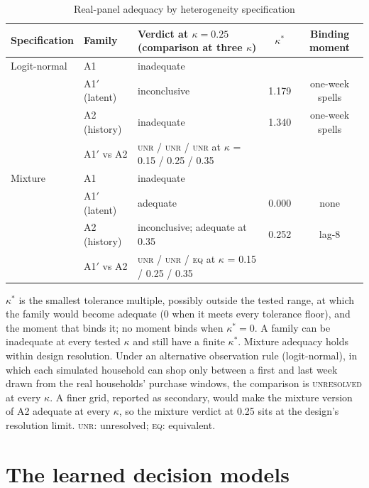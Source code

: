 \documentclass[11pt]{article}
\begin{document}
\begin{table}[h]
\centering\small
\caption{Real-panel adequacy by heterogeneity specification}
\label{tab:real}
\begin{tabular}{@{}l l l c c@{}}
\toprule
Specification & Family & Verdict at $\kappa=0.25$ (comparison at three $\kappa$) & $\kappa^*$ & Binding moment \\
\midrule
Logit-normal & A1 & inadequate & & \\
             & A1$'$ (latent) & inconclusive & 1.179 & one-week spells \\
             & A2 (history) & inadequate & 1.340 & one-week spells \\
             & A1$'$ vs A2 & \textsc{unr} / \textsc{unr} / \textsc{unr} at $\kappa$ = 0.15 / 0.25 / 0.35 & & \\
\addlinespace[6pt]
Mixture      & A1 & inadequate & & \\
             & A1$'$ (latent) & adequate & 0.000 & none \\
             & A2 (history) & inconclusive; adequate at 0.35 & 0.252 & lag-8 \\
             & A1$'$ vs A2 & \textsc{unr} / \textsc{unr} / \textsc{eq} at $\kappa$ = 0.15 / 0.25 / 0.35 & & \\
\bottomrule
\end{tabular}

\smallskip
\parbox{0.94\textwidth}{\footnotesize $\kappa^*$ is the smallest tolerance multiple, possibly
outside the tested range, at which the family would become adequate (0 when it meets every tolerance floor), and the moment that binds it; no moment binds when $\kappa^*=0$.
A family can be inadequate at every tested $\kappa$ and still have a finite $\kappa^*$. Mixture
adequacy holds within design resolution. Under an alternative observation rule (logit-normal),
in which each simulated household can shop only between a first and last week drawn from the
real households' purchase windows, the comparison is \textsc{unresolved} at every $\kappa$. A finer grid,
reported as secondary, would make the mixture version of A2 adequate at every $\kappa$, so the
mixture verdict at 0.25 sits at the design's resolution limit. \textsc{unr}:
unresolved; \textsc{eq}: equivalent.}
\end{table}

\section{The learned decision models}
\label{app:policies}
\end{document}
